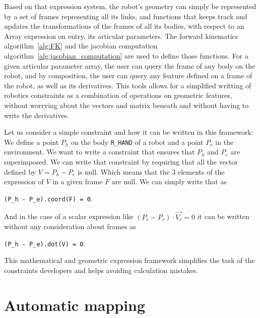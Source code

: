 Based on that expression system, the robot's geometry can simply be represented by a set of frames representing all its links, and functions that keeps track and updates the transformations of the frames of all its bodies, with respect to an Array expression on entry, its articular parameters.
The forward kinematics algorithm~\ref{alg:FK} and the jacobian computation algorithm~\ref{alg:jacobian_computation} are used to define those functions.
For a given articular parameter array, the user can query the frame of any body on the robot, and by composition, the user can query any feature defined on a frame of the robot, as well as its derivatives.
This tools allows for a simplified writting of robotics constraints as a combination of operations on geometric features, without worrying about the vectors and matrix beneath and without having to write the derivatives.

Let us consider a simple constraint and how it can be written in this framework:
We define a point $P_h$ on the body {\tt R\_HAND} of a robot and a point $P_e$ in the environment.
We want to write a constraint that ensures that $P_h$ and $P_e$ are superimposed.
We can write that constraint by requiring that all the vector defined by $V = P_h - P_e$ is null.
Which means that the 3 elements of the expression of $V$ in a given frame $F$ are null.
We can simply write that as
\begin{center}
{\tt(P\_h - P\_e).coord(F) = 0}.
\end{center}
And in the case of a scalar expression like $(P_e - P_r)\cdot \overrightarrow{V_r} = 0$ it can be written without any consideration about frames as
\begin{center}
{\tt(P\_h - P\_e).dot(V) = 0}.
\end{center}

This mathematical and geometric expression framework simplifies the task of the constraints developers and helps avoiding calculation mistakes.

\section{Automatic mapping}
\label{sec:automatic_mapping}

